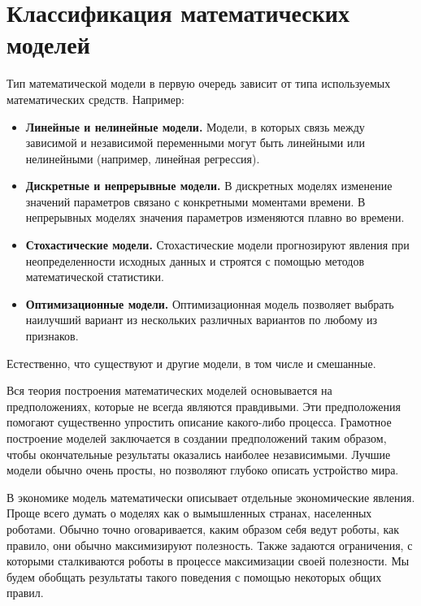 \section{Классификация математических моделей}

Тип математической модели в первую очередь зависит от типа используемых математических средств.
Например:
\begin{itemize}
	\item \textbf{Линейные и нелинейные модели.}
	Модели, в которых связь между зависимой и независимой переменными могут быть линейными или нелинейными (например, линейная регрессия).
	\item \textbf{Дискретные и непрерывные модели.}
	В дискретных моделях изменение значений параметров связано с конкретными моментами времени.
	В непрерывных моделях значения параметров изменяются плавно во времени.
	\item \textbf{Стохастические модели.}
	Стохастические модели прогнозируют явления при неопределенности исходных данных и строятся с помощью методов математической статистики.
	\item \textbf{Оптимизационные модели.}
	Оптимизационная модель позволяет выбрать наилучший вариант из нескольких различных вариантов по любому из признаков.
\end{itemize}
Естественно, что существуют и другие модели, в том числе и смешанные.

Вся теория построения математических моделей основывается на предположениях, которые не всегда являются правдивыми.
Эти предположения помогают существенно упростить описание какого-либо процесса.
Грамотное построение моделей заключается в создании предположений таким образом, чтобы окончательные результаты оказались наиболее независимыми.
Лучшие модели обычно очень просты, но позволяют глубоко описать устройство мира.

В экономике модель математически описывает отдельные экономические явления.
Проще всего думать о моделях как о вымышленных странах, населенных роботами.
Обычно точно оговаривается, каким образом себя ведут роботы, как правило, они обычно максимизируют полезность.
Также задаются ограничения, с которыми сталкиваются роботы в процессе максимизации своей полезности.
Мы будем обобщать результаты такого поведения с помощью некоторых общих правил.

